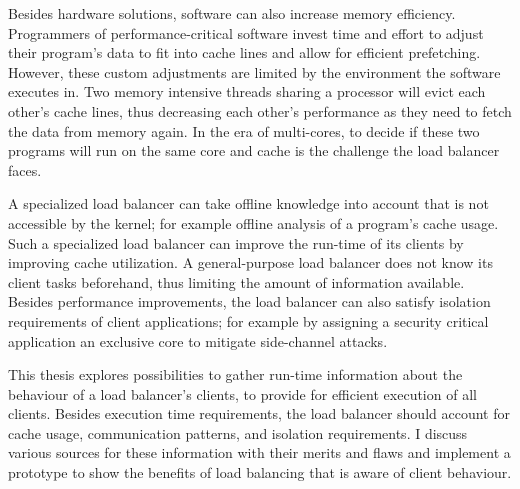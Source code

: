 Besides hardware solutions, software can also increase memory efficiency.
Programmers of performance-critical software invest time and effort to adjust
their program's data to fit into cache lines and allow for efficient prefetching.
However, these custom adjustments are limited by the environment the software
executes in.
Two memory intensive threads sharing a processor will evict each other's
cache lines, thus decreasing each other's performance as they need to fetch the
data from memory again.
In the era of multi-cores, to decide if these two programs will run on
the same core and cache is the challenge the load balancer faces.

\begin{comment}
While Linux runs a scheduler which is also in charge of load balancing, these
are two separate jobs.
It is the scheduler's duty to provide an equal amount of CPU time to each
running task, depending on the task's priority.
To decide, which tasks runs on which core on the other hand,
that is the responsibility of the load balancer.

Thus, the load balancer is not necessarily part of the kernel.
To allow for workload specific load balancers, Linux provides an interface to
overrule kernel decisions.
This is also the case for the Fiasco.OC microkernel and the L4Re user-land
environment.
\end{comment}

A specialized load balancer can take offline knowledge into account that is not
accessible by the kernel;
for example offline analysis of a program's cache usage.
Such a specialized load balancer can improve the run-time of its clients by
improving cache utilization.
A general-purpose load balancer does not know its client tasks
beforehand, thus limiting the amount of information available.
Besides performance improvements, the load balancer can also satisfy isolation
requirements of client applications; for example by assigning a security
critical application an exclusive core to mitigate side-channel attacks.

This thesis explores possibilities to gather run-time information about the
behaviour of a load balancer's clients, to provide for efficient execution of
all clients.
Besides execution time requirements, the load balancer should account for cache usage,
communication patterns, and isolation requirements.
I discuss various sources for these information with their merits and flaws and
implement a prototype to show the benefits of load balancing that is aware of
client behaviour.
\pagebreak

